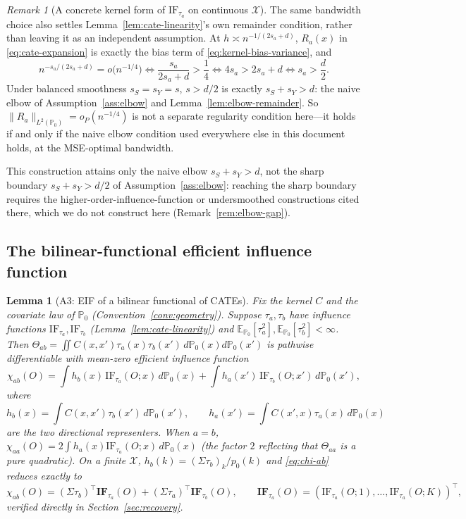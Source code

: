 \documentclass[11pt]{article}
\theoremstyle{plain}
\newtheorem{lemma}[theorem]{Lemma}
\theoremstyle{definition}
\theoremstyle{remark}
\newtheorem{remark}[theorem]{Remark}
\newcommand{\E}{\mathbb{E}}
\newcommand{\PP}{\mathbb{P}}
\newcommand{\cX}{\mathcal{X}}
\newcommand{\IF}{\mathrm{IF}}
\begin{document}
\begin{remark}[A concrete kernel form of $\IF_{\tau_a}$ on continuous $\cX$]
The same bandwidth choice also settles Lemma~\ref{lem:cate-linearity}'s own remainder
condition, rather than leaving it as an independent assumption. At
$h\asymp n^{-1/(2s_a+d)}$, $R_a(x)$ in \eqref{eq:cate-expansion} is exactly the bias
term of \eqref{eq:kernel-bias-variance}, and
\[
    n^{-s_a/(2s_a+d)} = o\big(n^{-1/4}\big)
    \iff \frac{s_a}{2s_a+d} > \frac14
    \iff 4s_a>2s_a+d
    \iff s_a>\frac d2.
\]
Under balanced smoothness $s_S=s_Y=s$, $s>d/2$ is exactly $s_S+s_Y>d$: the naive
elbow of Assumption~\ref{ass:elbow} and Lemma~\ref{lem:elbow-remainder}. So
$\|R_a\|_{L^2(\PP_0)}=o_P(n^{-1/4})$ is not a separate regularity condition here---it
holds if and only if the naive elbow condition used everywhere else in this document
holds, at the MSE-optimal bandwidth.

This construction attains only the naive elbow $s_S+s_Y>d$, not the sharp boundary
$s_S+s_Y>d/2$ of Assumption~\ref{ass:elbow}: reaching the sharp boundary requires the
higher-order-influence-function or undersmoothed constructions cited there, which we
do not construct here (Remark~\ref{rem:elbow-gap}).
\end{remark}

\subsection{The bilinear-functional efficient influence function}

\begin{lemma}[A3: EIF of a bilinear functional of CATEs]\label{lem:bilinear-eif}
Fix the kernel $C$ and the covariate law of $\PP_0$ (Convention~\ref{conv:geometry}).
Suppose $\tau_a,\tau_b$ have influence functions $\IF_{\tau_a},\IF_{\tau_b}$
(Lemma~\ref{lem:cate-linearity}) and $\E_{\PP_0}[\tau_a^2],\E_{\PP_0}[\tau_b^2]<\infty$.
Then $\Theta_{ab}=\iint C(x,x')\tau_a(x)\tau_b(x')\,d\PP_0(x)d\PP_0(x')$ is pathwise
differentiable with mean-zero efficient influence function
\begin{equation}\label{eq:chi-ab}
    \chi_{ab}(O) = \int h_b(x)\,\IF_{\tau_a}(O;x)\,d\PP_0(x)
        + \int h_a(x')\,\IF_{\tau_b}(O;x')\,d\PP_0(x'),
\end{equation}
where
\begin{equation}\label{eq:h-directions}
    h_b(x)=\int C(x,x')\tau_b(x')\,d\PP_0(x'), \qquad h_a(x')=\int C(x',x)\tau_a(x)\,d\PP_0(x)
\end{equation}
are the two \emph{directional representers}. When $a=b$,
$\chi_{aa}(O)=2\int h_a(x)\IF_{\tau_a}(O;x)\,d\PP_0(x)$ (the factor $2$ reflecting that
$\Theta_{aa}$ is a pure quadratic). On a finite $\cX$, $h_b(k)=(\Sigma\tau_b)_k/p_0(k)$
and \eqref{eq:chi-ab} reduces exactly to
\begin{equation}\label{eq:chi-ab-discrete}
    \chi_{ab}(O) = (\Sigma\tau_b)^\top\mathbf{IF}_{\tau_a}(O) + (\Sigma\tau_a)^\top\mathbf{IF}_{\tau_b}(O),
    \qquad \mathbf{IF}_{\tau_a}(O)=(\IF_{\tau_a}(O;1),\dots,\IF_{\tau_a}(O;K))^\top,
\end{equation}
verified directly in Section~\ref{sec:recovery}.
\end{lemma}
\end{document}
